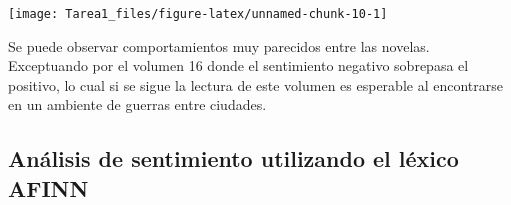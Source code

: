 \documentclass[
]{article}
\newenvironment{Shaded}{\begin{snugshade}}{\end{snugshade}}
\newcommand{\DataTypeTok}[1]{\textcolor[rgb]{0.13,0.29,0.53}{#1}}
\newcommand{\DecValTok}[1]{\textcolor[rgb]{0.00,0.00,0.81}{#1}}
\newcommand{\FloatTok}[1]{\textcolor[rgb]{0.00,0.00,0.81}{#1}}
\newcommand{\KeywordTok}[1]{\textcolor[rgb]{0.13,0.29,0.53}{\textbf{#1}}}
\newcommand{\NormalTok}[1]{#1}
\newcommand{\OperatorTok}[1]{\textcolor[rgb]{0.81,0.36,0.00}{\textbf{#1}}}
\newcommand{\OtherTok}[1]{\textcolor[rgb]{0.56,0.35,0.01}{#1}}
\newcommand{\StringTok}[1]{\textcolor[rgb]{0.31,0.60,0.02}{#1}}
\begin{document}
\begin{Shaded}
\end{Shaded}

\texttt{[image: Tarea1\_files/figure-latex/unnamed-chunk-10-1]}

Se puede observar comportamientos muy parecidos entre las novelas.
Exceptuando por el volumen 16 donde el sentimiento negativo sobrepasa el
positivo, lo cual si se sigue la lectura de este volumen es esperable al
encontrarse en un ambiente de guerras entre ciudades.

\hypertarget{anuxe1lisis-de-sentimiento-utilizando-el-luxe9xico-afinn}{%
\subsection{\texorpdfstring{\textbf{Análisis de sentimiento utilizando
el léxico
AFINN}}{Análisis de sentimiento utilizando el léxico AFINN}}\label{anuxe1lisis-de-sentimiento-utilizando-el-luxe9xico-afinn}}
\end{document}
